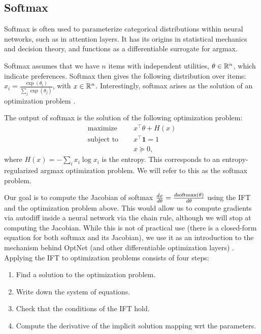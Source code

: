 \documentclass[11pt]{article}
\begin{document}
\subsection{Softmax}
Softmax is often used to parameterize categorical distributions within neural networks,
such as in attention layers.
It has its origins in statistical mechanics and decision theory, and functions
as a differentiable surrogate for argmax.

Softmax assumes that we have $n$ items with independent utilities, $\theta \in \mathbb{R}^n$,
which indicate preferences.
Softmax then gives the following distribution over items:
$x_i = \frac{\exp(\theta_i)}{\sum_j \exp(\theta_j)}$, with $x\in\mathbb{R}^n$.
Interestingly, softmax arises as the solution of an optimization problem
\citep{gao2018properties}.

The output of softmax is the solution of the following optimization problem:
\begin{equation}
\label{eqn:softmax-opt}
\begin{aligned}
\textrm{maximize } \quad & x^\top\theta + H(x)\\
\textrm{subject to } \quad & x^\top \mathbf{1} = 1\\
& x \succeq 0,
\end{aligned}
\end{equation}
where $H(x) = -\sum_i x_i \log x_i$ is the entropy.
This corresponds to an entropy-regularized argmax optimization problem.
We will refer to this as the softmax problem.

Our goal is to compute the Jacobian of softmax
$\frac{dx}{d\theta} = \frac{d\mathrm{softmax}(\theta)}{d\theta}$
using the IFT and the optimization problem above.
This would allow us to compute gradients via autodiff inside a
neural network via the chain rule,
although we will stop at computing the Jacobian.
While this is not of practical use (there is a closed-form equation
for both softmax and its Jacobian),
we use it as an introduction to the mechanism
behind OptNet (and other differentiable optimization layers)
\citep{optnet,agrawal2019diffcvx}.
Applying the IFT to optimization problems consists of four steps:
\begin{enumerate}
\item Find a solution to the optimization problem.
\item Write down the system of equations.
\item Check that the conditions of the IFT hold.
\item Compute the derivative of the implicit solution mapping wrt the parameters.
\end{enumerate}
\end{document}
